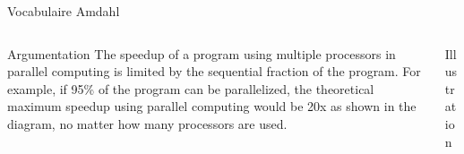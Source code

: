 
\begin{Frame}{Vocabulaire Amdahl}
  \begin{columns}[t]
    \begin{column}{5cm} %
      \begin{block}{Argumentation}
        The speedup of a program using multiple processors in parallel
        computing is limited by the sequential fraction of the
        program. For example, if 95\% of the program can be
        parallelized, the theoretical maximum speedup using parallel
        computing would be 20x as shown in the diagram, no matter how
        many processors are used.  
\end{block}
    \end{column}
    
    \begin{column}{5cm} %
      \begin{block}{Illustration}
      \end{block}   
    \end{column}
  \end{columns}  
\end{Frame}


